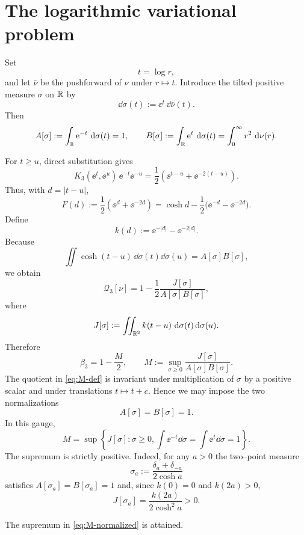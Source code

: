 \section{The logarithmic variational problem}\label{sec:log}

Set
\[
 t=\log r,
\]
and let $\bar\nu$ be the pushforward of $\nu$ under $r\mapsto t$.  Introduce the tilted positive measure $\sigma$ on $\mathbb{R}$ by
\begin{equation}\label{eq:sigma-def}
 \dd\sigma(t):=\ee^t\,\dd\bar\nu(t).
\end{equation}
Then
\[
 A[\sigma]:=\int_{\mathbb{R}} \mathrm{e}^{-t}\,\,\mathrm{d}\sigma(t)=1,
 \qquad
 B[\sigma]:=\int_{\mathbb{R}} \mathrm{e}^t\,\,\mathrm{d}\sigma(t)=\int_0^\infty r^2\,\,\mathrm{d}\nu(r).
\]

For $t\ge u$, direct substitution gives
\[
 K_3(\ee^t,\ee^u)\,\ee^{-t}\ee^{-u}
 =\frac12\left(\ee^{t-u}+\ee^{-2(t-u)}\right).
\]
Thus, with $d=|t-u|$,
\[
 F(d):=\frac12(\ee^d+\ee^{-2d})
 =\cosh d-\frac12\bigl(\ee^{-d}-\ee^{-2d}\bigr).
\]
Define
\[
 k(d):=\ee^{-|d|}-\ee^{-2|d|}.
\]
Because
\[
 \iint \cosh(t-u)\,\dd\sigma(t)\dd\sigma(u)=A[\sigma]B[\sigma],
\]
we obtain
\[
 \mathcal Q_3[\nu]
 =1-\frac{1}{2}\frac{J[\sigma]}{A[\sigma]B[\sigma]},
\]
where
\[
 J[\sigma]:=\iint_{\mathbb{R}^2}k(t-u)\,\,\mathrm{d}\sigma(t)\,\mathrm{d}\sigma(u).
\]
Therefore
\begin{equation}\label{eq:M-def}
 \beta_3=1-\frac{M}{2},
 \qquad
 M:=\sup_{\sigma\ge0}\frac{J[\sigma]}{A[\sigma]B[\sigma]}.
\end{equation}
The quotient in \eqref{eq:M-def} is invariant under multiplication of $\sigma$ by a positive scalar and under translations $t\mapsto t+c$.  Hence we may impose the two normalizations
\begin{equation}\label{eq:normalization}
 A[\sigma]=B[\sigma]=1.
\end{equation}
In this gauge,
\begin{equation}\label{eq:M-normalized}
 M=\sup\left\{J[\sigma]:\sigma\ge0,
 \int\ee^{-t}\dd\sigma=\int\ee^t\dd\sigma=1\right\}.
\end{equation}
The supremum is strictly positive.  Indeed, for any $a>0$ the two--point measure
\[
 \sigma_a:=\frac{\delta_a+\delta_{-a}}{2\cosh a}
\]
satisfies $A[\sigma_a]=B[\sigma_a]=1$ and, since $k(0)=0$ and $k(2a)>0$,
\[
 J[\sigma_a]=\frac{k(2a)}{2\cosh^2 a}>0.
\]

\begin{lemma}\label{lem:existence}
The supremum in \eqref{eq:M-normalized} is attained.
\end{lemma}

